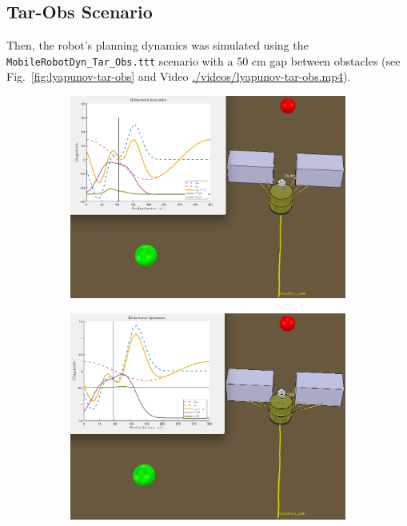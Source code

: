 \subsection{Tar-Obs Scenario}%
\label{sec:tar-obs-scenario-lyapunov}
Then, the robot's planning dynamics was simulated using the
\texttt{MobileRobotDyn\_Tar\_Obs.ttt} scenario with a 50 cm gap between
obstacles (see Fig.~\ref{fig:lyapunov-tar-obs} and 
Video \href{run:./videos/lyapunov-tar-obs.mp4}{./videos/lyapunov-tar-obs.mp4}). 
%
\begin{figure}[htb!]
  \centering
%
  \begin{subfigure}{.49\textwidth}
    \includegraphics[width=\textwidth]{img/lyapunov-tar-obs-1.PNG}%
  \caption{}%
  \label{fig:lyapunov-tar-obs-1}
  \end{subfigure}
%
  \begin{subfigure}{.49\textwidth}
    \includegraphics[width=\textwidth]{img/lyapunov-tar-obs-2.PNG}%

\end{subfigure}
\end{figure}
